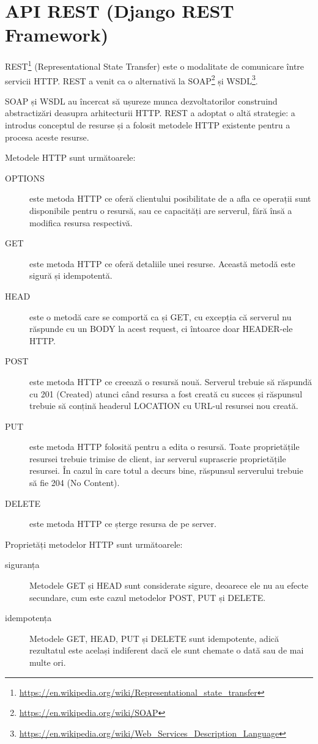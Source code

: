 \section{API REST (Django REST Framework)}

REST\footnote{\url{https://en.wikipedia.org/wiki/Representational_state_transfer}} (Representational State Transfer)
este o modalitate
de comunicare între servicii HTTP. REST a venit ca o alternativă
la SOAP\footnote{\url{https://en.wikipedia.org/wiki/SOAP}} și 
WSDL\footnote{\url{https://en.wikipedia.org/wiki/Web\_Services\_Description\_Language}}. 

SOAP și WSDL au încercat să ușureze munca dezvoltatorilor 
construind abstractizări deasupra
arhitecturii HTTP. REST a adoptat o altă strategie:
a introdus conceptul de resurse și a folosit
metodele HTTP existente pentru a procesa aceste resurse.

Metodele HTTP sunt următoarele:
\begin{description}
\item [OPTIONS] este metoda HTTP ce oferă clientului
posibilitate de a afla ce operații sunt disponibile
pentru o resursă, sau ce capacități are serverul,
fără însă a modifica resursa respectivă.
\item [GET] este metoda HTTP ce oferă detaliile unei resurse.
Această metodă este sigură și idempotentă.
\item [HEAD] este o metodă care se comportă ca și GET, cu 
excepția că serverul nu răspunde cu un BODY la acest request,
ci întoarce doar HEADER-ele HTTP.
\item [POST] este metoda HTTP ce creează o resursă nouă.
Serverul trebuie să răspundă cu 201 (Created) atunci când resursa
a fost creată cu succes și răspunsul trebuie să conțină
headerul LOCATION cu URL-ul resursei nou creată.
\item [PUT] este metoda HTTP folosită pentru a edita
o resursă. Toate proprietățile resursei trebuie trimise
de client, iar serverul suprascrie proprietățile resursei.
În cazul în care totul a decurs bine, răspunsul serverului
trebuie să fie 204 (No Content).
\item [DELETE] este metoda HTTP ce șterge resursa de pe server.
\end{description}

Proprietăți metodelor HTTP sunt următoarele:
\begin{description}
\item [siguranța] Metodele GET și HEAD sunt considerate
sigure, deoarece ele nu au efecte secundare, cum este cazul
metodelor POST, PUT și DELETE.
\item [idempotența] Metodele GET, HEAD, PUT și DELETE sunt
idempotente, adică rezultatul este același indiferent
dacă ele sunt chemate o dată sau de mai multe ori.
\end{description}

